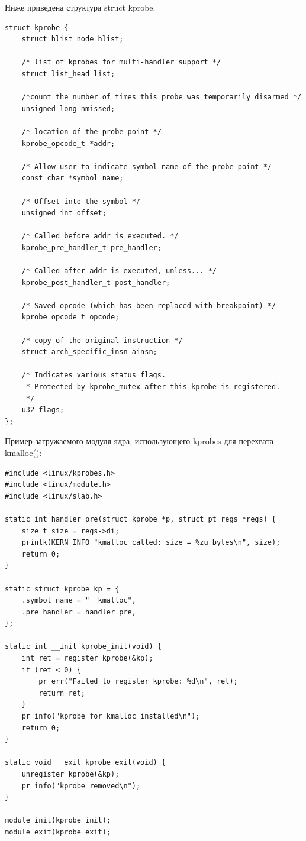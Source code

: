 Ниже приведена структура struct kprobe.

\begin{lstlisting}[caption={struct kprobe}]
struct kprobe {
	struct hlist_node hlist;

	/* list of kprobes for multi-handler support */
	struct list_head list;

	/*count the number of times this probe was temporarily disarmed */
	unsigned long nmissed;

	/* location of the probe point */
	kprobe_opcode_t *addr;

	/* Allow user to indicate symbol name of the probe point */
	const char *symbol_name;

	/* Offset into the symbol */
	unsigned int offset;

	/* Called before addr is executed. */
	kprobe_pre_handler_t pre_handler;

	/* Called after addr is executed, unless... */
	kprobe_post_handler_t post_handler;

	/* Saved opcode (which has been replaced with breakpoint) */
	kprobe_opcode_t opcode;

	/* copy of the original instruction */
	struct arch_specific_insn ainsn;

	/* Indicates various status flags.
	 * Protected by kprobe_mutex after this kprobe is registered.
	 */
	u32 flags;
};
\end{lstlisting}

Пример загружаемого модуля ядра, использующего kprobes для перехвата kmalloc():
\begin{lstlisting}
#include <linux/kprobes.h>
#include <linux/module.h>
#include <linux/slab.h>

static int handler_pre(struct kprobe *p, struct pt_regs *regs) {
    size_t size = regs->di;
    printk(KERN_INFO "kmalloc called: size = %zu bytes\n", size);
    return 0;
}

static struct kprobe kp = {
    .symbol_name = "__kmalloc",
    .pre_handler = handler_pre,
};

static int __init kprobe_init(void) {
    int ret = register_kprobe(&kp);
    if (ret < 0) {
        pr_err("Failed to register kprobe: %d\n", ret);
        return ret;
    }
    pr_info("kprobe for kmalloc installed\n");
    return 0;
}

static void __exit kprobe_exit(void) {
    unregister_kprobe(&kp);
    pr_info("kprobe removed\n");
}

module_init(kprobe_init);
module_exit(kprobe_exit);
\end{lstlisting}

